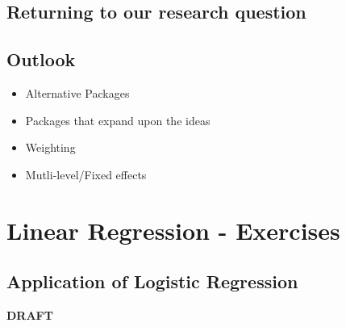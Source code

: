 \documentclass[
]{book}
\providecommand{\tightlist}{%
  \setlength{\itemsep}{0pt}\setlength{\parskip}{0pt}}
\begin{document}
\hypertarget{returning-to-our-research-question-2}{%
\section{Returning to our research question}\label{returning-to-our-research-question-2}}

\hypertarget{outlook}{%
\section{Outlook}\label{outlook}}

\begin{itemize}
\tightlist
\item
  Alternative Packages
\item
  Packages that expand upon the ideas
\item
  Weighting
\item
  Mutli-level/Fixed effects
\end{itemize}

\hypertarget{lin-e}{%
\chapter{Linear Regression - Exercises}\label{lin-e}}

\hypertarget{application-of-logistic-regression}{%
\section{Application of Logistic Regression}\label{application-of-logistic-regression}}

\textbf{DRAFT}
\end{document}
